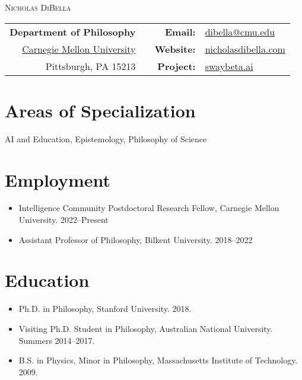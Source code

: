 \documentclass[11pt,letterpaper]{article}
\begin{document}

\begin{center}
    {\Large\textsc{Nicholas DiBella}}\\[0.2cm]
\end{center}

\vspace{-0.5cm}

\begin{center}
\begin{tabular}{r l r l}
\textbf{Department of Philosophy} & \hfill & \textbf{Email:} & \href{mailto:dibella@cmu.edu}{dibella@cmu.edu} \\
\href{https://www.cmu.edu/dietrich/philosophy/}{Carnegie Mellon University} & \hfill & \textbf{Website:} & \href{https://nicholasdibella.com}{nicholasdibella.com} \\
Pittsburgh, PA 15213 & \hfill & \textbf{Project:} & \href{https://www.swaybeta.ai}{swaybeta.ai} \\
\end{tabular}
\end{center}

\section*{Areas of Specialization}
AI and Education, Epistemology, Philosophy of Science

\section*{Employment}
\begin{itemize}
    \item Intelligence Community Postdoctoral Research Fellow, Carnegie Mellon University. 2022--Present
    \item Assistant Professor of Philosophy, Bilkent University. 2018--2022
\end{itemize}

\section*{Education}
\begin{itemize}
    \item Ph.D. in Philosophy, Stanford University. 2018.
    \item Visiting Ph.D. Student in Philosophy, Australian National University. Summers 2014--2017.
    \item B.S. in Physics, Minor in Philosophy, Massachusetts Institute of Technology. 2009.
\end{itemize}
\end{document}
